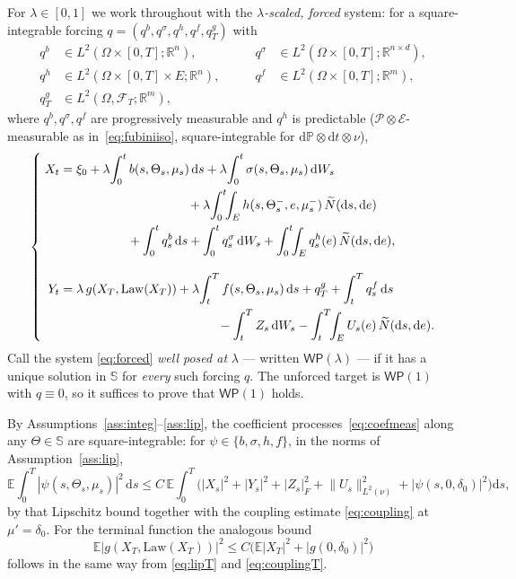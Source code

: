 \documentclass[preprint,12pt]{elsarticle}
\newcommand{\R}{\mathbb{R}}
\newcommand{\E}{\mathbb{E}}
\newcommand{\Prob}{\mathbb{P}}
\newcommand{\F}{\mathcal{F}}
\newcommand{\diff}{\mathrm{d}}
\newcommand{\Nt}{\widetilde{N}}
\newcommand{\Lnu}{L^2(\nu)}
\newcommand{\Law}{\mathrm{Law}}
\newcommand{\HH}{\mathbb{S}}
\newcommand{\Lnorm}[1]{\lVert #1\rVert_{\Lnu}}
\numberwithin{equation}{section}
\theoremstyle{plain}
\theoremstyle{definition}
\theoremstyle{\PaperRemarkStyle}
\begin{document}
For $\lambda\in[0,1]$ we work throughout with the \emph{$\lambda$-scaled, forced}
system: for a square-integrable forcing
$q=(q^b,q^\sigma,q^h,q^f,q^g_T)$ with
\[
\begin{aligned}
q^b&\in L^2(\Omega\times[0,T];\R^n),
&\qquad q^\sigma&\in L^2(\Omega\times[0,T];\R^{n\times d}),\\
q^h&\in L^2(\Omega\times[0,T]\times E;\R^n),
&\qquad q^f&\in L^2(\Omega\times[0,T];\R^m),\\
q^g_T&\in L^2(\Omega,\F_T;\R^m),
\end{aligned}
\]
where $q^b,q^\sigma,q^f$ are progressively
measurable and $q^h$ is predictable ($\mathcal P\otimes\mathcal E$-measurable as
in~\eqref{eq:fubiniiso}, square-integrable for $\diff\Prob\otimes\diff t\otimes\nu$),
\begin{equation}\label{eq:forced}
\left\{\;\begin{aligned}
X_t&=\xi_0+\lambda\!\int_0^t b(s,\Theta_s,\mu_s)\,\diff s
+\lambda\!\int_0^t\sigma(s,\Theta_s,\mu_s)\,\diff W_s\\
&\hspace{10.2em}+\lambda\!\int_0^t\!\!\int_E h(s,\Theta_s^-,e,\mu_s^-)\,\Nt(\diff s,\diff e)\\
&\hspace{5.4em}+\int_0^t q_s^b\,\diff s+\int_0^t q_s^\sigma\,\diff W_s
+\int_0^t\!\!\int_E q_s^h(e)\,\Nt(\diff s,\diff e),\\[2.2ex]
Y_t&=\lambda\,g(X_T,\Law(X_T))+\lambda\!\int_t^T f(s,\Theta_s,\mu_s)\,\diff s
+q_T^g+\int_t^T q_s^f\,\diff s\\
&\hspace{12.6em}-\int_t^T Z_s\,\diff W_s-\int_t^T\!\!\int_E U_s(e)\,\Nt(\diff s,\diff e).
\end{aligned}\right.
\end{equation}
Call the system \eqref{eq:forced} \emph{well posed at} $\lambda$ --- written
$\mathsf{WP}(\lambda)$ --- if it has a unique solution in $\HH$ for \emph{every} such
forcing $q$. The unforced target is
$\mathsf{WP}(1)$ with $q\equiv0$, so it suffices to prove that
$\mathsf{WP}(1)$ holds.

By Assumptions~\ref{ass:integ}--\ref{ass:lip}, the coefficient processes~\eqref{eq:coefmeas}
along any $\Theta\in\HH$ are square-integrable: for $\psi\in\{b,\sigma,h,f\}$, in the norms of
Assumption~\ref{ass:lip},
\begin{equation}\label{eq:coeffint}
\E\!\int_0^T\!|\psi(s,\Theta_s,\mu_s)|^2\,\diff s
\le C\,\E\!\int_0^T\!\Big(|X_s|^2+|Y_s|^2+|Z_s|_F^2+\Lnorm{U_s}^2
+|\psi(s,0,\delta_0)|^2\Big)\diff s,
\end{equation}
by that Lipschitz bound together with the coupling estimate \eqref{eq:coupling} at
$\mu'=\delta_0$. For the terminal function the analogous bound
\begin{equation}\label{eq:termg}
\E|g(X_T,\Law(X_T))|^2\le C\big(\E|X_T|^2+|g(0,\delta_0)|^2\big)
\end{equation}
follows in the same way from \eqref{eq:lipT} and \eqref{eq:couplingT}.
\end{document}
